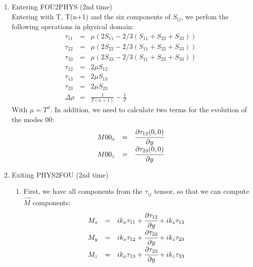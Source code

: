 \documentclass[titlepage,11pt]{article}
\newcommand\ppy[1]{\cfrac{\partial#1}{\partial y}} %
\begin{document}
\begin{enumerate}
\item  Entering FOU2PHYS (2nd time) \\
	Entering with T, T(n+1) and the six components of $S_{ij}$, we perfom the following operations in physical domain:
		\begin{equation}
			\begin{array}{lcl}
				\tau_{11}&=&\mu \left( 2S_{11}-2/3\left(S_{11}+S_{22}+S_{33}\right) \right) \\
				\tau_{22}&=&\mu \left( 2S_{22}-2/3\left(S_{11}+S_{22}+S_{33}\right) \right) \\
				\tau_{33}&=&\mu \left( 2S_{33}-2/3\left(S_{11}+S_{22}+S_{33}\right) \right) \\
				\tau_{12}&=&2 \mu S_{12} \\
				\tau_{13}&=&2 \mu S_{13} \\
				\tau_{23}&=&2 \mu S_{23} \\
				\Delta \rho &=& \frac{1}{T(n+1)}-\frac{1}{T}
			\end{array}
		\end{equation}
	With $\mu=T^\sigma$.
	In addition, we need to calculate two terms for the evolution of the modes 00:
	\begin{equation}
			\begin{array}{lcl}
				M00_{x}&=& \ppy{\tau_{12} (0,0)}\\
				M00_{z}&=& \ppy{\tau_{23} (0,0)}
			\end{array}
		\end{equation}



\item Exiting PHYS2FOU (2nd time) \\

\begin{enumerate}


	\item
	First, we have all components from the $\tau_{ij}$ tensor, so that we can compute $\vec{M}$ components:
		\begin{equation}
			\begin{array}{lcl}
				M_{x}&=&i k_x{\tau_{11}} + \ppy{\tau_{12}} + i k_z{\tau_{13}}\\
				M_{y}&=&i k_x{\tau_{12}} + \ppy{\tau_{22}} + i k_z{\tau_{23}}\\
				M_{z}&=&i k_x{\tau_{13}} + \ppy{\tau_{23}} + i k_z{\tau_{33}}
			\end{array}
		\end{equation}


\end{enumerate}
\end{enumerate}
\end{document}
